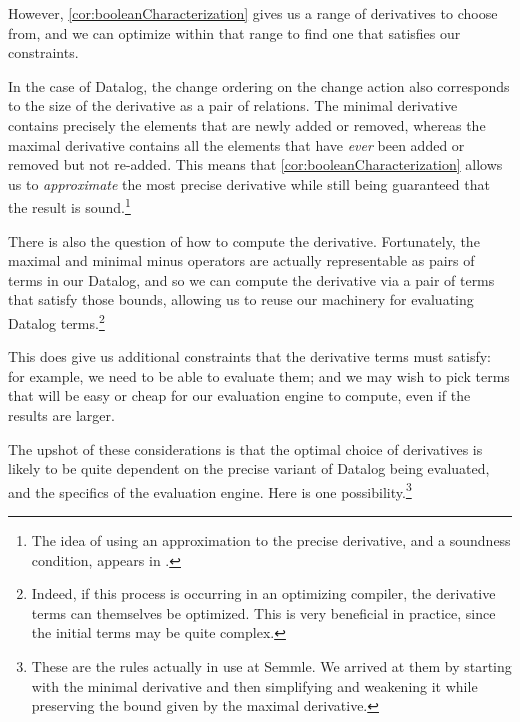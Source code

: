 However, \cref{cor:booleanCharacterization} gives us a range of derivatives to
choose from, and we can optimize within that range to find one that satisfies
our constraints.

In the case of Datalog, the change ordering on the change action also
corresponds to the size of the derivative as a pair of relations. The minimal
derivative contains precisely the elements that are newly added or removed,
whereas the maximal derivative contains all the elements that have \emph{ever}
been added or removed but not re-added. This means that \cref{cor:booleanCharacterization} allows
us to \emph{approximate} the most precise derivative while still being
guaranteed that the result is sound.\footnote{The idea of using an approximation
to the precise derivative, and a soundness condition, appears in \textcite{bancilhon1986amateur}.}

There is also the question of how to compute the derivative. Fortunately, the
maximal and minimal minus operators are actually representable as pairs of terms
in our Datalog, and so we can compute the derivative via a pair of terms that
satisfy those bounds, allowing us to reuse our machinery for evaluating Datalog
terms.\footnote{Indeed, if this process is occurring in an optimizing compiler,
  the derivative terms can themselves be optimized. This is very 
  beneficial in practice, since the initial terms may be quite complex.}

This does give us additional constraints that the derivative terms must satisfy:
for example, we need to be able to evaluate them; and we may wish to pick terms that will be easy or cheap
for our evaluation engine to compute, even if the results are larger.

The upshot of these considerations is that the optimal choice of derivatives is likely
to be quite dependent on the precise variant of Datalog being evaluated, and the
specifics of the evaluation engine. Here is one possibility.\footnote{These are
  the rules actually in use at Semmle. We arrived at them by starting with the
  minimal derivative and then simplifying and weakening it while preserving the
  bound given by the maximal derivative.}

